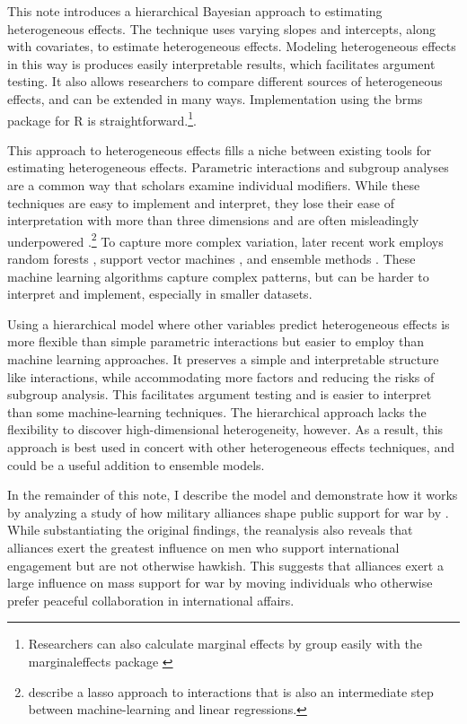 \documentclass[12pt]{article}
\begin{document}
This note introduces a hierarchical Bayesian approach to estimating heterogeneous effects. 
The technique uses varying slopes and intercepts, along with covariates, to estimate heterogeneous effects. 
Modeling heterogeneous effects in this way is produces easily interpretable results, which facilitates argument testing. 
It also allows researchers to compare different sources of heterogeneous effects, and can be extended in many ways.  
Implementation using the brms package for \textsf{R} is straightforward.\footnote{Researchers can also calculate marginal effects by group easily with the marginaleffects package \citep{ArelBundockme}}. 


This approach to heterogeneous effects fills a niche between existing tools for estimating heterogeneous effects.
Parametric interactions and subgroup analyses are a common way that scholars examine individual modifiers. 
While these techniques are easy to implement and interpret, they lose their ease of interpretation with more than three dimensions and are often misleadingly underpowered \citep{Simmonsetal2011}.\footnote{\citet{BlackwellOlson2022} describe a lasso approach to interactions that is also an intermediate step between machine-learning and linear regressions.}
To capture more complex variation, later recent work employs random forests \citep{GreenKern2012, WagerAthey2018}, support vector machines \citep{ImaiRatkovic2013}, and ensemble methods \citep{Grimmeretal2017, Kuenzeletal2019, Dorieetal2022}.
These machine learning algorithms capture complex patterns, but can be harder to interpret and implement, especially in smaller datasets. 

 
 
Using a hierarchical model where other variables predict heterogeneous effects is more flexible than simple parametric interactions but easier to employ than machine learning approaches.  
It preserves a simple and interpretable structure like interactions, while accommodating more factors and reducing the risks of subgroup analysis. 
This facilitates argument testing and is easier to interpret than some machine-learning techniques.
The hierarchical approach lacks the flexibility to discover high-dimensional heterogeneity, however.  
As a result, this approach is best used in concert with other heterogeneous effects techniques, and could be a useful addition to ensemble models. 


In the remainder of this note, I describe the model and demonstrate how it works by analyzing a study of how military alliances shape public support for war by \citet{TomzWeeks2021}. 
While substantiating the original findings, the reanalysis also reveals that alliances exert the greatest influence on men who support international engagement but are not otherwise hawkish. 
This suggests that alliances exert a large influence on mass support for war by moving individuals who otherwise prefer peaceful collaboration in international affairs. 
\end{document}
